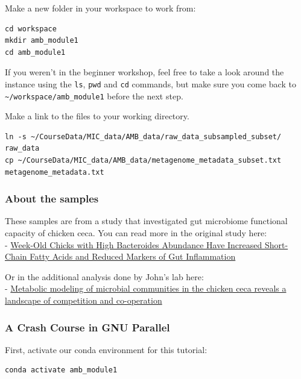 \documentclass[
]{book}
\begin{document}
Make a new folder in your workspace to work from:

\begin{verbatim}
cd workspace
mkdir amb_module1
cd amb_module1
\end{verbatim}

If you weren't in the beginner workshop, feel free to take a look around the instance using the \texttt{ls}, \texttt{pwd} and \texttt{cd} commands, but make sure you come back to \texttt{\textasciitilde{}/workspace/amb\_module1} before the next step.

Make a link to the files to your working directory.

\begin{verbatim}
ln -s ~/CourseData/MIC_data/AMB_data/raw_data_subsampled_subset/ raw_data
cp ~/CourseData/MIC_data/AMB_data/metagenome_metadata_subset.txt metagenome_metadata.txt
\end{verbatim}

\subsubsection{About the samples}\label{about-the-samples}

These samples are from a study that investigated gut microbiome functional capacity of chicken ceca. You can read more in the original study here:\\
- \href{https://journals.asm.org/doi/full/10.1128/spectrum.03616-22}{Week-Old Chicks with High Bacteroides Abundance Have Increased Short-Chain Fatty Acids and Reduced Markers of Gut Inflammation}

Or in the additional analysis done by John's lab here:\\
- \href{https://www.biorxiv.org/content/10.1101/2024.10.14.618310v1.full}{Metabolic modeling of microbial communities in the chicken ceca reveals a landscape of competition and co-operation}

\subsubsection{A Crash Course in GNU Parallel}\label{a-crash-course-in-gnu-parallel}

First, activate our conda environment for this tutorial:

\begin{verbatim}
conda activate amb_module1
\end{verbatim}
\end{document}
